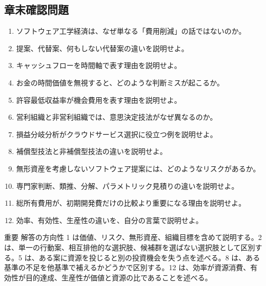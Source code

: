 \subsection{章末確認問題}

\begin{enumerate}
  \item ソフトウェア工学経済は、なぜ単なる「費用削減」の話ではないのか。
  \item 提案、代替案、何もしない代替案の違いを説明せよ。
  \item キャッシュフローを時間軸で表す理由を説明せよ。
  \item お金の時間価値を無視すると、どのような判断ミスが起こるか。
  \item 許容最低収益率が機会費用を表す理由を説明せよ。
  \item 営利組織と非営利組織では、意思決定技法がなぜ異なるのか。
  \item 損益分岐分析がクラウドサービス選択に役立つ例を説明せよ。
  \item 補償型技法と非補償型技法の違いを説明せよ。
  \item 無形資産を考慮しないソフトウェア提案には、どのようなリスクがあるか。
  \item 専門家判断、類推、分解、パラメトリック見積りの違いを説明せよ。
  \item 総所有費用が、初期開発費だけの比較より重要になる理由を説明せよ。
  \item 効率、有効性、生産性の違いを、自分の言葉で説明せよ。
\end{enumerate}

\begin{pointbox}{重要}
解答の方向性 1 は価値、リスク、無形資産、組織目標を含めて説明する。2 は、単一の行動案、相互排他的な選択肢、候補群を選ばない選択肢として区別する。5 は、ある案に資源を投じると別の投資機会を失う点を述べる。8 は、ある基準の不足を他基準で補えるかどうかで区別する。12 は、効率が資源消費、有効性が目的達成、生産性が価値と資源の比であることを述べる。
\end{pointbox}
